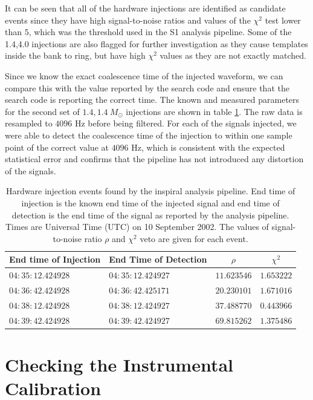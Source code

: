 It can be seen that all of the hardware injections are identified as candidate
events since they have high signal-to-noise ratios and values of the $\chi^2$
test lower than $5$, which was the threshold used in the S1 analysis
pipeline\cite{LIGOS1iul}. Some of the 1.4,4.0 injections are also flagged
for further investigation as they cause templates inside the bank to ring, but
have high $\chi^2$ values as they are not exactly matched.

Since we know the exact coalescence time of the injected waveform, we can
compare this with the value reported by the search code and ensure that the
search code is reporting the correct time.  The known and measured parameters
for the second set of $1.4,1.4\ M_\odot$ injections are shown in table
\ref{t:triggers}. The raw data is resampled to $4096$ Hz before being
filtered. For each of the signals injected, we were able to detect the
coalescence time of the injection to within one sample point of the correct
value at $4096$ Hz, which is consistent with the expected statistical error
and confirms that the pipeline has not introduced any distortion of the
signals.

\begin{table}[htb]
  \begin{flushright}
  \begin{tabular}{l|l|c|c}
  End time of Injection&End Time of Detection&$\rho$&$\chi^2$\\
  \hline
  $04:35:12.424928$ & $04:35:12.424927$ & $11.623546$ & $1.653222$ \\
  $04:36:42.424928$ & $04:36:42.425171$ & $20.230101$ & $1.671016$ \\
  $04:38:12.424928$ & $04:38:12.424927$ & $37.488770$ & $0.443966$ \\
  $04:39:42.424928$ & $04:39:42.424927$ & $69.815262$ & $1.375486$ \\
  \end{tabular}
  \end{flushright}
  \caption{%
  Hardware injection events found by the inspiral analysis pipeline. End time
  of injection is the known end time of the injected signal and end time of
  detection is the end time of the signal as reported by the analysis
  pipeline. Times are Universal Time (UTC) on 10 September 2002. The values of
  signal-to-noise ratio $\rho$ and $\chi^2$ veto are given for each event.
  }
\label{t:triggers}
\end{table}

\section{Checking the Instrumental Calibration}
\label{s:calibration}

